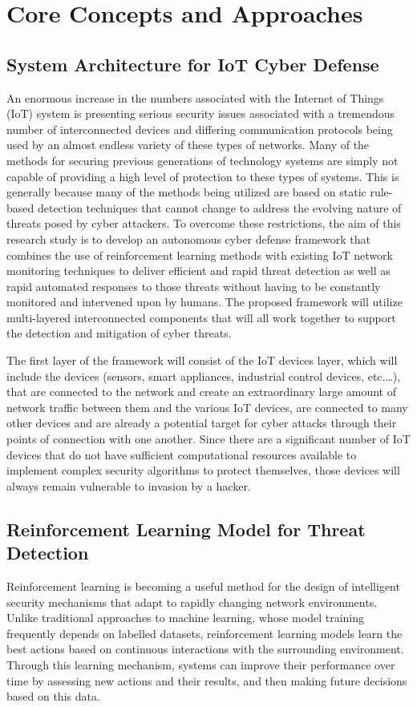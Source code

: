 \documentclass[12pt]{article}
\begin{document}
	
	

	\section{Core Concepts and Approaches}
	\subsection{System Architecture for IoT Cyber Defense}
    An enormous increase in the numbers associated with the Internet of Things (IoT) system is presenting serious security issues associated with a tremendous number of interconnected devices and differing communication protocols being used by an almost endless variety of these types of networks. Many of the methods for securing previous generations of technology systems are simply not capable of providing a high level of protection to these types of systems. This is generally because many of the methods being utilized are based on static rule-based detection techniques that cannot change to address the evolving nature of threats posed by cyber attackers. To overcome these restrictions, the aim of this research study is to develop an autonomous cyber defense framework that combines the use of reinforcement learning methods with existing IoT network monitoring techniques to deliver efficient and rapid threat detection as well as rapid automated responses to those threats without having to be constantly monitored and intervened upon by humans. The proposed framework will utilize multi-layered interconnected components that will all work together to support the detection and mitigation of cyber threats.

The first layer of the framework will consist of the IoT devices layer, which will include the devices (sensors, smart appliances, industrial control devices, etc.…), that are connected to the network and create an extraordinary large amount of network traffic between them and the various IoT devices, are connected to many other devices and are already a potential target for cyber attacks through their points of connection with one another. Since there are a significant number of IoT devices that do not have sufficient computational resources available to implement complex security algorithms to protect themselves, those devices will always remain vulnerable to invasion by a hacker.\cite{Ahmed2025,Khan2023,Wang2023}
    \subsection{Reinforcement Learning Model for Threat Detection}
    Reinforcement learning is becoming a useful method for the design of intelligent security mechanisms that adapt to rapidly changing network environments. Unlike traditional approaches to machine learning, whose model training frequently depends on labelled datasets, reinforcement learning models learn the best actions based on continuous interactions with the surrounding environment. Through this learning mechanism, systems can improve their performance over time by assessing new actions and their results, and then making future decisions based on this data.\cite{Kumar2024}
\end{document}
